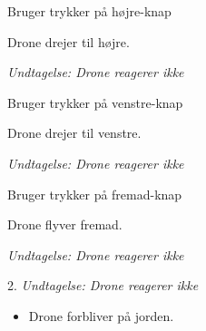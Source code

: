 \documentclass[Main]{subfiles}
\begin{document}
\begin{UseCase}
	\begin{normFor}
	\item Bruger trykker på højre-knap
	\item Drone drejer til højre.
	\item[] \textit{Undtagelse: Drone reagerer ikke}
	\end{normFor} 
	
	\begin{normFor}
	\item Bruger trykker på venstre-knap
	\item Drone drejer til venstre.
	\item[] \textit{Undtagelse: Drone reagerer ikke}
	\end{normFor} 
	
	\begin{normFor}
	\item Bruger trykker på fremad-knap
	\item Drone flyver fremad.
	\item[] \textit{Undtagelse: Drone reagerer ikke}
	\end{normFor} 

	\begin{normFor}
	\item[2.] \textit{Undtagelse: Drone reagerer ikke}
		\begin{itemize}
		\item Drone forbliver på jorden.
		\end{itemize}
	\end{normFor} 
	
\end{UseCase}
\end{document}
